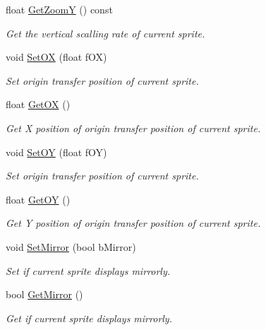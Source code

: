 \begin{DoxyCompactItemize}
float \hyperlink{class_iris2_d_1_1_iris_sprite_a350aab21a9e40f7d26b8d757d26e4df2}{Get\+ZoomY} () const
\begin{DoxyCompactList}\small\item\em Get the vertical scalling rate of current sprite. \end{DoxyCompactList}\item 
void \hyperlink{class_iris2_d_1_1_iris_sprite_ae4b2cbedd03a92ac0b68b9e701df2e68}{Set\+OX} (float f\+OX)
\begin{DoxyCompactList}\small\item\em Set origin transfer position of current sprite. \end{DoxyCompactList}\item 
float \hyperlink{class_iris2_d_1_1_iris_sprite_a134ad89bea2b664a912574737bd418e5}{Get\+OX} ()
\begin{DoxyCompactList}\small\item\em Get X position of origin transfer position of current sprite. \end{DoxyCompactList}\item 
void \hyperlink{class_iris2_d_1_1_iris_sprite_a6dba8492659c67a9c09359ed321a89b3}{Set\+OY} (float f\+OY)
\begin{DoxyCompactList}\small\item\em Set origin transfer position of current sprite. \end{DoxyCompactList}\item 
float \hyperlink{class_iris2_d_1_1_iris_sprite_adfdf12a18ff5237e1b27b63c2a27adaf}{Get\+OY} ()
\begin{DoxyCompactList}\small\item\em Get Y position of origin transfer position of current sprite. \end{DoxyCompactList}\item 
void \hyperlink{class_iris2_d_1_1_iris_sprite_a3ce55ee044b8345e93f8dfd45f23c72f}{Set\+Mirror} (bool b\+Mirror)
\begin{DoxyCompactList}\small\item\em Set if current sprite displays mirrorly. \end{DoxyCompactList}\item 
bool \hyperlink{class_iris2_d_1_1_iris_sprite_a5c4fa95fdadbb42ec65047b87786ec51}{Get\+Mirror} ()
\begin{DoxyCompactList}\small\item\em Get if current sprite displays mirrorly. \end{DoxyCompactList}\item 

\end{DoxyCompactItemize}
